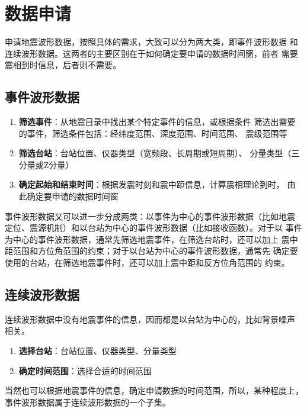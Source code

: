 \section{数据申请}
申请地震波形数据，按照具体的需求，大致可以分为两大类，即事件波形数据
和连续波形数据。这两者的主要区别在于如何确定要申请的数据时间窗，前者
需要震相到时信息，后者则不需要。

\subsection{事件波形数据}
\begin{enumerate}
\item \textbf{筛选事件}：从地震目录中找出某个特定事件的信息，或根据条件
    筛选出需要的事件，筛选条件包括：经纬度范围、深度范围、时间范围、
    震级范围等
\item \textbf{筛选台站}：台站位置、仪器类型（宽频段、长周期或短周期）、
    分量类型（三分量或Z分量）
\item \textbf{确定起始和结束时间}：根据发震时刻和震中距信息，计算震相理论到时，
    由此确定要申请的数据时间窗
\end{enumerate}

事件波形数据又可以进一步分成两类：以事件为中心的事件波形数据（比如地震
定位、震源机制）和以台站为中心的事件波形数据（比如接收函数）。对于以
事件为中心的事件波形数据，通常先筛选地震事件，在筛选台站时，还可以加上
震中距范围和方位角范围的约束；对于以台站为中心的事件波形数据，通常先
确定要使用的台站，在筛选地震事件时，还可以加上震中距和反方位角范围的
约束。

\subsection{连续波形数据}
连续波形数据中没有地震事件的信息，因而都是以台站为中心的，比如背景噪声
相关。
\begin{enumerate}
\item \textbf{选择台站}：台站位置、仪器类型、分量类型
\item \textbf{确定时间范围}：选择合适的时间范围
\end{enumerate}
当然也可以根据地震事件的信息，确定申请数据的时间范围，所以，某种程度上，
事件波形数据属于连续波形数据的一个子集。

